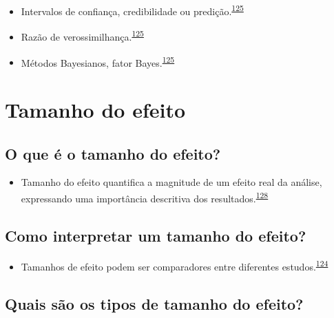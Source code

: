 \documentclass[
  a4paper,
]{book}
\providecommand{\tightlist}{%
  \setlength{\itemsep}{0pt}\setlength{\parskip}{0pt}}
\begin{document}
\begin{itemize}
\item
  Intervalos de confiança, credibilidade ou predição.\textsuperscript{\protect\hyperlink{ref-wasserstein2016}{125}}
\item
  Razão de verossimilhança.\textsuperscript{\protect\hyperlink{ref-wasserstein2016}{125}}
\item
  Métodos Bayesianos, fator Bayes.\textsuperscript{\protect\hyperlink{ref-wasserstein2016}{125}}
\end{itemize}

\hypertarget{tamanho-efeito}{%
\section{Tamanho do efeito}\label{tamanho-efeito}}

\hypertarget{o-que-uxe9-o-tamanho-do-efeito}{%
\subsection{O que é o tamanho do efeito?}\label{o-que-uxe9-o-tamanho-do-efeito}}

\begin{itemize}
\tightlist
\item
  Tamanho do efeito quantifica a magnitude de um efeito real da análise, expressando uma importância descritiva dos resultados.\textsuperscript{\protect\hyperlink{ref-Kim2015}{128}}
\end{itemize}

\hypertarget{como-interpretar-um-tamanho-do-efeito}{%
\subsection{Como interpretar um tamanho do efeito?}\label{como-interpretar-um-tamanho-do-efeito}}

\begin{itemize}
\tightlist
\item
  Tamanhos de efeito podem ser comparadores entre diferentes estudos.\textsuperscript{\protect\hyperlink{ref-Sullivan2012}{124}}
\end{itemize}

\hypertarget{quais-suxe3o-os-tipos-de-tamanho-do-efeito}{%
\subsection{Quais são os tipos de tamanho do efeito?}\label{quais-suxe3o-os-tipos-de-tamanho-do-efeito}}
\end{document}
